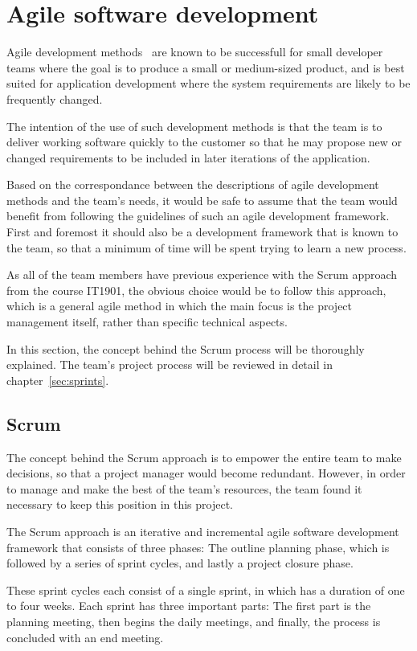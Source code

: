\section{Agile software development}

Agile development methods~\cite{scrum} are known to be successfull for small developer teams where the goal is to produce a small or medium-sized product, and is best suited for application development where the system requirements are likely to be frequently changed.

The intention of the use of such development methods is that the team is to deliver working software quickly to the customer so that he may propose new or changed requirements to be included in later iterations of the application.

Based on the correspondance between the descriptions of agile development methods and the team's needs, it would be safe to assume that the team would benefit from following the guidelines of such an agile development framework. First and foremost it should also be a development framework that is known to the team, so that a minimum of time will be spent trying to learn a new process.

As all of the team members have previous experience with the Scrum approach from the course IT1901, the obvious choice would be to follow this approach, which is a general agile method in which the main focus is the project management itself, rather than specific technical aspects. 

In this section, the concept behind the Scrum process will be thoroughly explained. The team's project process will be reviewed in detail in chapter~\ref{sec:sprints}.

\subsection{Scrum}
The concept behind the Scrum approach is to empower the entire team to make decisions, so that a project manager would become redundant. However, in order to manage and make the best of the team's resources, the team found it necessary to keep this position in this project.

The Scrum approach is an iterative and incremental agile software development framework that consists of three phases: The outline planning phase, which is followed by a series of sprint cycles, and lastly a project closure phase.

These sprint cycles each consist of a single sprint, in which has a duration of one to four weeks. Each sprint has three important parts:
The first part is the planning meeting, then begins the daily  meetings, and finally, the process is concluded with an end meeting.



